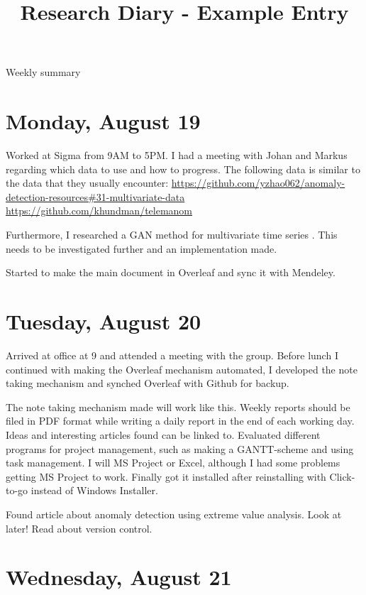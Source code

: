 \documentclass[11pt,letterpaper]{article}
\begin{document}
\univlogo

\title{Research Diary - Example Entry}

{\Huge Weekly summary}\\[5mm]

\section*{Monday, August 19}
Worked at Sigma from 9AM to 5PM. I had a meeting with Johan and Markus regarding which data to use and how to progress. The following data is similar to the data that they usually encounter: \newline
\url{https://github.com/yzhao062/anomaly-detection-resources#31-multivariate-data} \newline
\url{https://github.com/khundman/telemanom}

Furthermore, I researched a GAN method for multivariate time series \cite{Li2019a}. This needs to be investigated further and an implementation made.

Started to make the main document in Overleaf and sync it with Mendeley.

\section*{Tuesday, August 20}

Arrived at office at 9 and attended a meeting with the group. Before lunch I continued with making the Overleaf mechanism automated, I developed the note taking mechanism and synched Overleaf with Github for backup.

The note taking mechanism made will work like this. Weekly reports should be filed in PDF format while writing a daily report in the end of each working day. Ideas and interesting articles found can be linked to.
Evaluated different programs for project management, such as making a GANTT-scheme and using task management. I will MS Project or Excel, although I had some problems getting MS Project to work. Finally got it installed after reinstalling with Click-to-go instead of Windows Installer.

Found article about anomaly detection using extreme value analysis. Look at later! Read about version control.


\section*{Wednesday, August 21}
\end{document}

